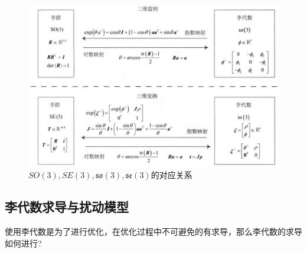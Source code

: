 \documentclass[10pt]{article}
\begin{document}
\begin{figure}[!htb]
    \includegraphics[width=\hsize]{images/对应关系.png}
    \caption{$SO(3),SE(3),\mathfrak{so}(3),\mathfrak{se}(3)$的对应关系} 
\end{figure}
\subsection{李代数求导与扰动模型}
使用李代数是为了进行优化，在优化过程中不可避免的有求导，那么李代数的求导如何进行?
\end{document}
